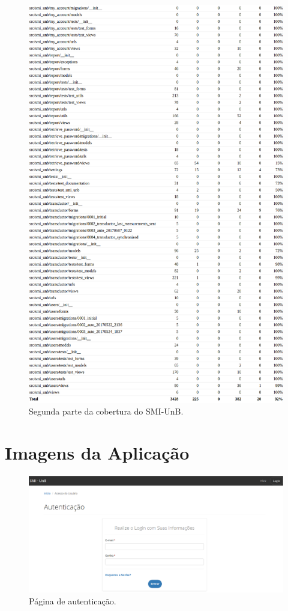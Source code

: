 \begin{anexosenv}
\begin{figure}[!htpb]
    \centering
    \includegraphics[keepaspectratio=true,scale=0.45]{figuras/cobertura02.eps}
    \caption{Segunda parte da cobertura do SMI-UnB.}
    \label{cobertura02}
\end{figure}

\chapter{Imagens da Aplicação}
\begin{figure}[!htpb]
    \centering
    \includegraphics[keepaspectratio=true,scale=0.35]{figuras/img1.eps}
    \caption{Página de autenticação.}
    \label{img1}
\end{figure}


\end{anexosenv}
